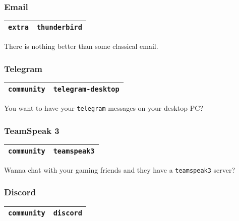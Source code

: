 \documentclass[9pt]{report}
\begin{document}
\vfill\eject

\hypertarget{x-email}{\subsubsection{Email}}
\begin{center}
\begin{tabular}{|c|c|}
\hline
\texttt{extra} & \texttt{thunderbird} \\ 
\hline
\end{tabular}
\end{center}

There is nothing better than some classical email.



\vfill\eject

\hypertarget{x-telegram}{\subsubsection{Telegram}}
\begin{center}
\begin{tabular}{|c|c|}
\hline
\texttt{community} & \texttt{telegram-desktop} \\ 
\hline
\end{tabular}
\end{center}

You want to have your \texttt{telegram} messages on your desktop PC?



\vfill\eject

\hypertarget{x-teamspeak-3}{\subsubsection{TeamSpeak 3}}
\begin{center}
\begin{tabular}{|c|c|}
\hline
\texttt{community} & \texttt{teamspeak3} \\ 
\hline
\end{tabular}
\end{center}

Wanna chat with your gaming friends and they have a \texttt{teamspeak3} server?



\vfill\eject

\hypertarget{x-discord}{\subsubsection{Discord}}
\begin{center}
\begin{tabular}{|c|c|}
\hline
\texttt{community} & \texttt{discord} \\ 
\hline
\end{tabular}
\end{center}
\end{document}
